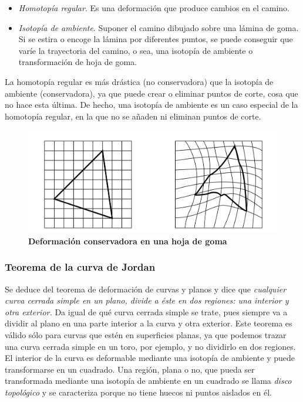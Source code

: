\begin{itemize}
\item \textit{Homotopía regular}. Es una deformación que produce cambios en el camino.
\item \textit{Isotopía de ambiente}. Suponer el camino dibujado sobre una lámina de goma. Si se estira o encoge la lámina por diferentes puntos, se puede conseguir que varíe la trayectoria del camino, o sea, una isotopía de ambiente o transformación de hoja de goma.
\end{itemize}

La homotopía regular es más drástica (no conservadora) que la isotopía de ambiente (conservadora), ya que puede crear o eliminar puntos de corte, cosa que no hace esta última. De hecho, una isotopía de ambiente es un caso especial de la homotopía regular, en la que no se añaden ni eliminan puntos de corte.


\begin{figure}[h]
\includegraphics[width=14cm]{Img/GEO/geo-goma.jpg}
\centering
\caption{\textbf{\footnotesize{Deformación conservadora en una hoja de goma}}}
\end{figure}


\subsubsection{ Teorema de la curva de Jordan }
Se deduce del teorema de deformación de curvas y planos y dice que \textit{cualquier curva cerrada simple en un plano, divide a éste en dos regiones: una interior y otra exterior.} Da igual de qué curva cerrada simple se trate, pues siempre va a dividir al plano en una
parte interior a la curva y otra exterior. Este teorema es válido sólo para curvas que estén en superficies planas, ya que podemos trazar una curva cerrada simple en un toro, por ejemplo, y no dividirlo en dos regiones.
El interior de la curva es deformable mediante una isotopía de ambiente y puede
transformarse en un cuadrado. Una región, plana o no, que pueda ser transformada mediante una isotopía de ambiente en un cuadrado se llama \textit{disco topológico} y se caracteriza porque no tiene huecos ni puntos aislados en él.

